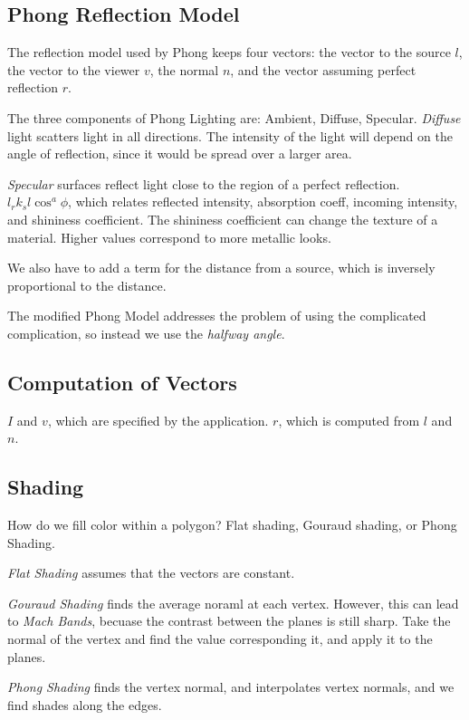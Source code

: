 \documentclass[portrait, 10pt, a4paper]{article}
\begin{document}
\begin{multicols*}{3}
	\subsection{Phong Reflection Model}
		The reflection model used by Phong keeps four vectors: the vector to the source $l$, the vector to the viewer
		$v$, the normal $n$, and the vector assuming perfect reflection $r$. 

		The three components of Phong Lighting are: Ambient, Diffuse, Specular. \textit{Diffuse} light scatters light
		in all directions. The intensity of the light will depend on the angle of reflection, since it would be 
		spread over a larger area.

		\textit{Specular} surfaces reflect light close to the region of a perfect reflection. $l_{r}k_{s}l\cos^{a}\phi$, 
		which relates reflected intensity, absorption coeff, incoming intensity, and shininess coefficient. The shininess
		coefficient can change the texture of a material. Higher values correspond to more metallic looks.

		We also have to add a term for the distance from a source, which is inversely proportional to the distance.
		
		The modified Phong Model addresses the problem of using the complicated complication, so instead we use 
		the \textit{halfway angle}.
	\subsection{Computation of Vectors}
		$I$ and $v$, which are specified by the application. $r$, which is computed from $l$ and $n$.
	\subsection{Shading}
		How do we fill color within a polygon? Flat shading, Gouraud shading, or Phong Shading.

		\textit{Flat Shading} assumes that the vectors are constant.

		\textit{Gouraud Shading} finds the average noraml at each vertex. However, this can lead to \textit{Mach Bands}, 
		becuase the contrast between the planes is still sharp. Take the normal of the vertex and find the value 
		corresponding it, and apply it to the planes.

		\textit{Phong Shading} finds the vertex normal, and interpolates vertex normals, and we find shades along the 
		edges.
\end{multicols*}
\end{document}
